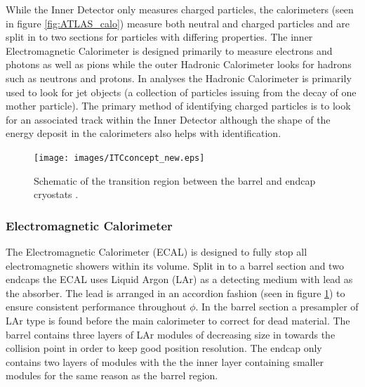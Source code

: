 		While the Inner Detector only measures charged particles, the calorimeters (seen in figure \ref{fig:ATLAS_calo}) measure both neutral and charged particles and are split in to two sections for particles with differing properties. The inner Electromagnetic Calorimeter is designed primarily to measure electrons and photons as well as pions while the outer Hadronic Calorimeter looks for hadrons such as neutrons and protons. In analyses the Hadronic Calorimeter is primarily used to look for jet objects (a collection of particles issuing from the decay of one mother particle). The primary method of identifying charged particles is to look for an associated track within the Inner Detector although the shape of the energy deposit in the calorimeters also helps with identification.



		\begin{figure}[h]
			\begin{center}
				\texttt{[image: images/ITCconcept\_new.eps]}
			\end{center}
			\caption{Schematic of the transition region between the barrel and endcap cryostats \cite{Aad:1129811}.}
			\label{fig:ATLAS_calo_crack}
		\end{figure}


		\subsubsection*{Electromagnetic Calorimeter}

		The Electromagnetic Calorimeter (ECAL) is designed to fully stop all electromagnetic showers within its volume. Split in to a barrel section and two endcaps the ECAL uses Liquid Argon (LAr) as a detecting medium with lead as the absorber. The lead is arranged in an accordion fashion (seen in figure \ref{fig:ATLAS_calo_crack}) to ensure consistent performance throughout $\phi$. In the barrel section a presampler of LAr type is found before the main calorimeter to correct for dead material. The barrel contains three layers of LAr modules of decreasing size in towards the collision point in order to keep good position resolution. The endcap only contains two layers of modules with the the inner layer containing smaller modules for the same reason as the barrel region.\\


